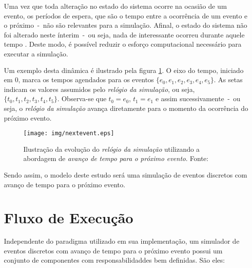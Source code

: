 Uma vez que toda alteração no estado do sistema ocorre na ocasião de um evento,
os períodos de espera, que são o tempo entre a ocorrência de um evento e o
próximo~-~não são relevantes para a simulação. Afinal, o estado do sistema não
foi alterado neste ínterim~-~ou seja, nada de interessante ocorreu durante
aquele tempo \cite{Sim}. Deste modo, é possível reduzir o esforço computacional
necessário para executar a simulação.

Um exemplo desta dinâmica é ilustrado pela figura \ref{fig:nextevent}. O eixo do
tempo, iniciado em 0, marca os tempos agendados para os eventos $\{e_{0}, e_{1},
e_{2}, e_{3}, e_{4}, e_{5}\}$. As setas indicam os valores assumidos pelo
\textit{relógio da simulação}, ou seja, $\{t_{0}, t_{1}, t_{2}, t_{3}, t_{4},
t_{5}\}$. Observa-se que $t_{0} = e_{0}$, $t_{1} = e_{1}$ e assim
sucessivamente~-~ou seja, o \textit{relógio da simulação} avança diretamente
para o momento da ocorrência do próximo evento.

\begin{figure}[htb!]
\centering\texttt{[image: img/nextevent.eps]}
\caption[Avanço de tempo para o próximo evento.]{\label{fig:nextevent}Ilustração da evolução do \textit{relógio da simulação} utilizando a abordagem de \textit{avanço de tempo para o próximo evento}. Fonte:~\cite{Law}}
\end{figure}

Sendo assim, o modelo deste estudo será uma simulação de eventos discretos com avanço de tempo para o próximo evento.

\section{\label{simulator:flow}Fluxo de Execução}

Independente do paradigma utilizado em sua implementação, um simulador de
eventos discretos com avanço de tempo para o próximo evento possui um conjunto
de componentes com responsabilidaddes bem definidas. São eles:

